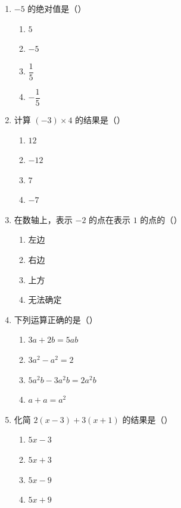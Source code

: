 \documentclass[12pt, a4paper]{ctexart}
\newcommand{\blank}[1]{\underline{\hspace{#1}}}
\begin{document}
\begin{enumerate}[label=\textbf{\arabic*.}, leftmargin=2.5em]

\item $-5$ 的绝对值是（\blank{1cm}）
\begin{enumerate}[label=\Alph*., nosep]
\item $5$
\item $-5$
\item $\dfrac{1}{5}$
\item $-\dfrac{1}{5}$
\end{enumerate}

\vspace{6pt}

\item 计算 $(-3) \times 4$ 的结果是（\blank{1cm}）
\begin{enumerate}[label=\Alph*., nosep]
\item $12$
\item $-12$
\item $7$
\item $-7$
\end{enumerate}

\vspace{6pt}

\item 在数轴上，表示 $-2$ 的点在表示 $1$ 的点的（\blank{1cm}）
\begin{enumerate}[label=\Alph*., nosep]
\item 左边
\item 右边
\item 上方
\item 无法确定
\end{enumerate}

\vspace{6pt}

\item 下列运算正确的是（\blank{1cm}）
\begin{enumerate}[label=\Alph*., nosep]
\item $3a + 2b = 5ab$
\item $3a^2 - a^2 = 2$
\item $5a^2b - 3a^2b = 2a^2b$
\item $a + a = a^2$
\end{enumerate}

\vspace{6pt}

\item 化简 $2(x - 3) + 3(x + 1)$ 的结果是（\blank{1cm}）
\begin{enumerate}[label=\Alph*., nosep]
\item $5x - 3$
\item $5x + 3$
\item $5x - 9$
\item $5x + 9$
\end{enumerate}


\end{enumerate}
\end{document}
